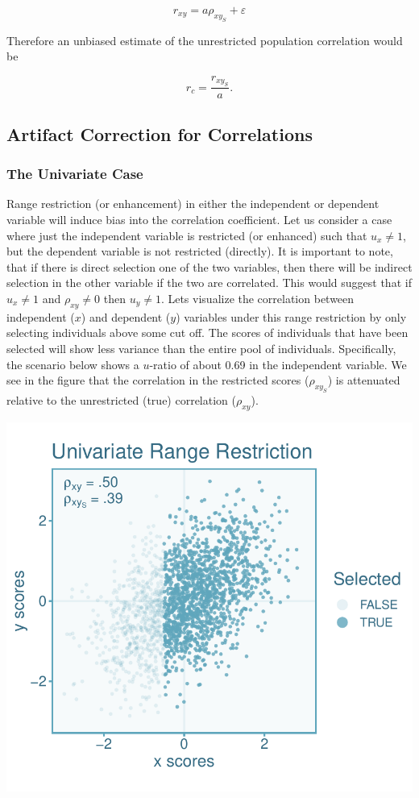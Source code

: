 \documentclass[
  letterpaper,
  DIV=11,
  numbers=noendperiod]{scrreprt}
\begin{document}
\[
r_{xy} = a \rho_{xy_S} + \varepsilon  
\]

Therefore an unbiased estimate of the unrestricted population
correlation would be

\[
r_c = \frac{ r_{xy_S} }{ a}.
\]

\hypertarget{artifact-correction-for-correlations}{%
\subsection{Artifact Correction for
Correlations}\label{artifact-correction-for-correlations}}

\hypertarget{the-univariate-case-1}{%
\subsubsection*{The Univariate Case}\label{the-univariate-case-1}}

Range restriction (or enhancement) in either the independent or
dependent variable will induce bias into the correlation coefficient.
Let us consider a case where just the independent variable is restricted
(or enhanced) such that \(u_x\neq 1\), but the dependent variable is not
restricted (directly). It is important to note, that if there is direct
selection one of the two variables, then there will be indirect
selection in the other variable if the two are correlated. This would
suggest that if \(u_x\neq 1\) and \(\rho_{xy}\neq 0\) then
\(u_y\neq 1\). Lets visualize the correlation between independent
(\(x\)) and dependent (\(y\)) variables under this range restriction by
only selecting individuals above some cut off. The scores of individuals
that have been selected will show less variance than the entire pool of
individuals. Specifically, the scenario below shows a \(u\)-ratio of
about 0.69 in the independent variable. We see in the figure that the
correlation in the restricted scores (\(\rho_{xy_S}\)) is attenuated
relative to the unrestricted (true) correlation (\(\rho_{xy}\)).

\includegraphics{direct_range_restriction_files/figure-pdf/unnamed-chunk-2-1.pdf}
\end{document}
